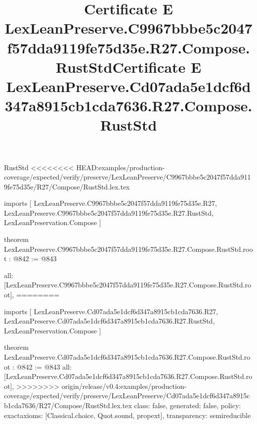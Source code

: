 \begin{lexlean}{RustStd}
<<<<<<<< HEAD:examples/production-coverage/expected/verify/preserve/LexLeanPreserve/C9967bbbe5c2047f57dda9119fe75d35e/R27/Compose/RustStd.lex.tex
\title{Certificate E LexLeanPreserve.C9967bbbe5c2047f57dda9119fe75d35e.R27.Compose.RustStd}
\begin{coremodule}
imports [
  LexLeanPreserve.C9967bbbe5c2047f57dda9119fe75d35e.R27,
  LexLeanPreserve.C9967bbbe5c2047f57dda9119fe75d35e.R27.RustStd,
  LexLeanPreservation.Compose
]

theorem LexLeanPreserve.C9967bbbe5c2047f57dda9119fe75d35e.R27.Compose.RustStd.root : @842 := @843 {
  all: [LexLeanPreserve.C9967bbbe5c2047f57dda9119fe75d35e.R27.Compose.RustStd.root],
========
\title{Certificate E LexLeanPreserve.Cd07ada5e1dcf6d347a8915cb1cda7636.R27.Compose.RustStd}
\begin{coremodule}
imports [
  LexLeanPreserve.Cd07ada5e1dcf6d347a8915cb1cda7636.R27,
  LexLeanPreserve.Cd07ada5e1dcf6d347a8915cb1cda7636.R27.RustStd,
  LexLeanPreservation.Compose
]

theorem LexLeanPreserve.Cd07ada5e1dcf6d347a8915cb1cda7636.R27.Compose.RustStd.root : @842 := @843 {
  all: [LexLeanPreserve.Cd07ada5e1dcf6d347a8915cb1cda7636.R27.Compose.RustStd.root],
>>>>>>>> origin/release/v0.4:examples/production-coverage/expected/verify/preserve/LexLeanPreserve/Cd07ada5e1dcf6d347a8915cb1cda7636/R27/Compose/RustStd.lex.tex
  class: false,
  generated: false,
  policy: exact{axioms: [Classical.choice, Quot.sound, propext]},
  transparency: semireducible
}


\end{coremodule}}
\end{coremodule}
\end{lexlean}
